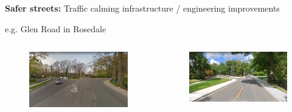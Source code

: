 \documentclass[aspectratio=169]{beamer}
\begin{document}
\begin{frame}
	
	\textbf{Safer streets:} Traffic calming infrastructure / engineering improvements
	
	\vspace{2mm}
	
	e.g. Glen Road in Rosedale
	
		\begin{columns}
		\begin{column}{0.5\textwidth}
			\begin{figure}
				\centering
				\includegraphics[width=1.1\linewidth]{images/glen_2016.png}
			\end{figure}
			
			
		\end{column}
		
		\begin{column}{0.5\textwidth}
			\begin{figure}
				\centering
				\includegraphics[width=1.2\linewidth]{images/glen_2021.png}
			\end{figure}
			
		\end{column}
		

\end{columns}
\end{frame}
\end{document}
